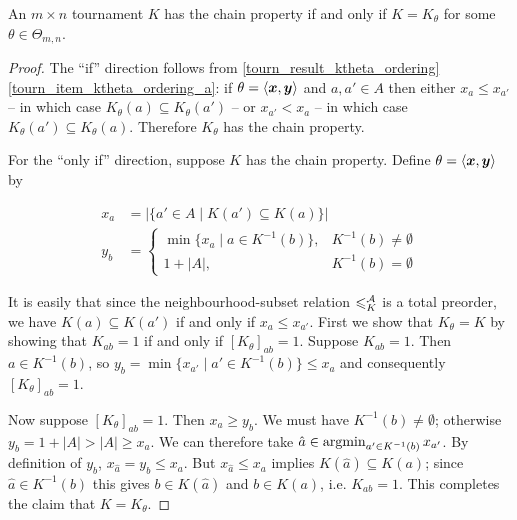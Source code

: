 \begin{lemma}
   \label{tourn_result_chain_iff_ktheta}

   An $m \times n$ tournament $K$ has the chain property if and only if $K =
   K_\theta$ for some $\theta \in \Theta_{m,n}$.

\end{lemma}

\begin{proof}
    The ``if'' direction follows from \cref{tourn_result_ktheta_ordering}
    \cref{tourn_item_ktheta_ordering_a}:
    if $\theta = \langle {\bm{x}, \bm{y}} \rangle$ and $a, a' \in A$ then
    either $x_a \le x_{a'}$ -- in which case $K_\theta(a)
    \subseteq K_\theta(a')$ -- or $x_{a'} < x_a$ -- in
    which case $K_\theta(a') \subseteq K_\theta(a)$. Therefore $K_\theta$ has
    the chain property.

    For the ``only if'' direction, suppose $K$ has the chain property.
    Define $\theta = \langle {\bm{x}, \bm{y}} \rangle$ by

    \[
       \begin{aligned}
           x_a &= |\{a' \in A \mid K(a') \subseteq K(a)\}| \\
           y_b &= \begin{cases}
              \min\{x_a \mid a \in K^{-1}(b)\}
                  ,& K^{-1}(b) \ne \emptyset \\
              1 + |A|,& K^{-1}(b) = \emptyset
           \end{cases}
       \end{aligned}
    \]

    It is easily that since the neighbourhood-subset relation ${\leqslant^{\mathcal{A}}_K}$ is a
    total preorder, we have $K(a) \subseteq K(a')$ if and only if $x_a \le
    x_{a'}$.  First we show that $K_\theta = K$ by showing that $K_{ab} = 1$ if
    and only if $[K_\theta]_{ab} = 1$. Suppose $K_{ab} = 1$. Then $a \in
    K^{-1}(b)$, so $y_b = \min\{x_{a'} \mid a' \in K^{-1}(b)\} \le x_a$ and
    consequently $[K_\theta]_{ab} = 1$.

    Now suppose $[K_\theta]_{ab} = 1$. Then $x_a \ge y_b$.  We must have
    $K^{-1}(b) \ne \emptyset$; otherwise $y_b = 1 + |A|
    > |A| \ge x_a$. We can therefore take $\hat{a} \in \argmin_{a'
    \in K^{-1}(b)}{x_{a'}}$. By definition of $y_b$, $x_{\hat{a}} = y_b \le
    x_a$. But $x_{\hat{a}} \le x_a$ implies $K(\hat{a}) \subseteq K(a)$; since
    $\hat{a} \in K^{-1}(b)$ this gives $b \in K(\hat{a})$ and $b \in K(a)$,
    i.e. $K_{ab} = 1$. This completes the claim that $K = K_\theta$.


\end{proof}
